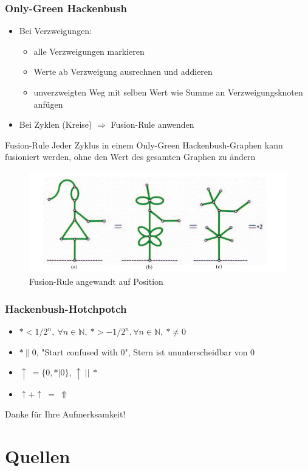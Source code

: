 \documentclass[12pt, aspectratio=169]{beamer}
\begin{document}
\begin{frame}
    \frametitle{Only-Green Hackenbush}
    \begin{itemize}
        \item<1-> Bei Verzweigungen:
        \begin{itemize}
            \item<1-> alle Verzweigungen markieren
            \item<1-> Werte ab Verzweigung ausrechnen und addieren
            \item<1-> unverzweigten Weg mit selben Wert wie Summe an Verzweigungsknoten anfügen
        \end{itemize}
        \item<2-> Bei Zyklen (Kreise) $\Rightarrow$ Fusion-Rule anwenden
    \end{itemize}
     {
    \begin{block}{Fusion-Rule}
        Jeder Zyklus in einem Only-Green Hackenbush-Graphen kann fusioniert werden,
        ohne den Wert des gesamten Graphen zu ändern
    \end{block}
    }
\end{frame}

\begin{frame}
    \begin{figure}
        \includegraphics[width=\textwidth]{pic/green-girl.png}
        \caption{Fusion-Rule angewandt auf Position \tiny{\cite{ww}}}
    \end{figure}
\end{frame}

\begin{frame}
    \frametitle{Hackenbush-Hotchpotch}
    \begin{itemize}
        \item<1-> $* < 1/2^n, \: \forall n \in \mathbb{N}, \: * > -1/2^n, \forall n \in \mathbb{N}, \: * \neq 0$
        \item<2-> $* \: || \: 0$, "Start confused with 0", Stern ist ununterscheidbar von 0
        \item<3-> $\uparrow \: = \{0,* | 0\}$, $\uparrow \: || \: *$
        \item<3-> $\uparrow + \uparrow \: = \: \Uparrow$
    \end{itemize}
\end{frame}

\begin{frame}
    \centering
    \huge{Danke für Ihre Aufmerksamkeit!}
\end{frame}

\section{Quellen}
\begin{frame}
    \nocite{*}
	\hfill
    
    
\end{frame}
\end{document}
